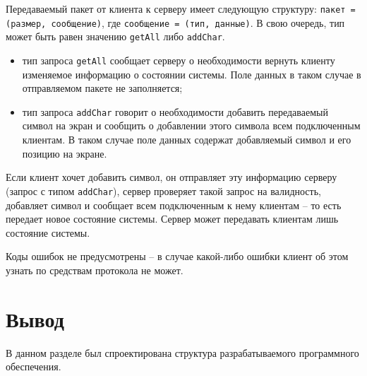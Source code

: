 Передаваемый пакет от клиента к серверу имеет следующую структуру: \texttt{пакет = (размер, сообщение)}, где \texttt{сообщение = (тип, данные)}. В свою очередь, тип может быть равен значению \texttt{getAll} либо \texttt{addChar}. 

\begin{itemize}
	\item тип запроса \texttt{getAll} сообщает серверу о необходимости вернуть клиенту изменяемое информацию о состоянии системы. Поле данных в таком случае в отправляемом пакете не заполняется;
	\item тип запроса \texttt{addChar} говорит о необходимости добавить передаваемый символ на экран и сообщить о добавлении этого символа всем подключенным клиентам. В таком случае поле данных содержат добавляемый символ и его позицию на экране.
\end{itemize}

Если клиент хочет добавить символ, он отправляет эту информацию серверу (запрос с типом \texttt{addChar}), сервер проверяет такой запрос на валидность, добавляет символ и сообщает всем подключенным к нему клиентам -- то есть передает новое состояние системы. Сервер может передавать клиентам лишь состояние системы.

Коды ошибок не предусмотрены -- в случае какой-либо ошибки клиент об этом узнать по средствам протокола не может.

\section*{Вывод}

В данном разделе был спроектирована структура разрабатываемого программного обеспечения.

